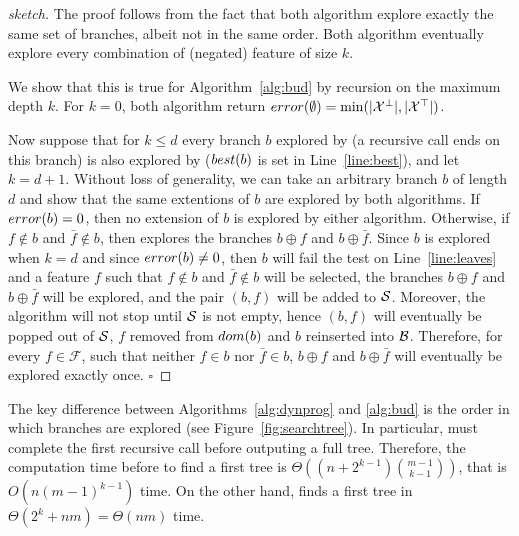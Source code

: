 \documentclass{llncs}
\newcommand{\setex}[1]{\ensuremath{{\mathcal X}^{#1}}\xspace}
\newcommand{\posex}{{\setex{\top}}\xspace}
\newcommand{\negex}{{\setex{\bot}}\xspace}
\newcommand{\features}{\ensuremath{{\mathcal F}}\xspace}
\newcommand{\bud}[0]{\ensuremath{{\cal B}}}
\newcommand{\sequence}[0]{\ensuremath{{\cal S}}}
\newcommand{\afeat}[0]{\ensuremath{f}}
\newcommand{\dom}[1][]{\ensuremath{\ifthenelse{\equal{#1}{}}{dom}{dom({#1})}}}
\newcommand{\best}[1][]{\ensuremath{\ifthenelse{\equal{#1}{}}{{best}}{{best({#1})}}}}
\newcommand{\error}[1][]{\ensuremath{\ifthenelse{\equal{#1}{}}{{error}}{{error({{#1}})}}}}
\newcommand{\abranch}[0]{\ensuremath{b}}
\newcommand{\numex}[0]{\ensuremath{n}}
\newcommand{\numfeat}[0]{\ensuremath{m}}
\newcommand{\mdepth}[0]{\ensuremath{k}}
\newcommand{\grow}[2]{\ensuremath{{#1}\oplus{#2}}}
\begin{document}
			\begin{proof}[sketch]
				The proof follows from the fact that both algorithm explore exactly the same set of branches, albeit not in the same order.
				Both algorithm eventually explore every combination of (negated) feature of size $\mdepth$.
				
				We show that this is true for Algorithm~\ref{alg:bud} by recursion on the maximum depth $\mdepth$.
				For $\mdepth = 0$, both algorithm return $\error[\emptyset]=\min(|\negex|, |\posex|)$.
				
				Now suppose that for $\mdepth \leq d$ every branch $\abranch$ explored by \dynprog (a recursive call ends on this branch) is also explored by \budalg ($\best[\abranch]$ is set in Line~\ref{line:best}), and let $\mdepth=d+1$. Without loss of generality, we can take an arbitrary branch $\abranch$ of length $d$ and show that the same extentions of $\abranch$ are explored by both algorithms.
				If $\error[\abranch]=0$, then no extension of $\abranch$ is explored by either algorithm.
				Otherwise, if $\afeat \not\in \abranch$ and $\bar{\afeat}\not\in \abranch$, then 
				\dynprog explores the branches $\grow{\abranch}{\afeat}$ and $\grow{\abranch}{\bar{\afeat}}$.
				Since $\abranch$ is explored when $\mdepth = d$ and since $\error[\abranch] \neq 0$, then $\abranch$ will fail the test on Line~\ref{line:leaves} and a feature $\afeat$ such that $\afeat \not\in \abranch$ and $\bar{\afeat}\not\in \abranch$ will be selected, 
				the branches $\grow{\abranch}{\afeat}$ and $\grow{\abranch}{\bar{\afeat}}$ will be explored, and the pair $(\abranch, \afeat)$ will be added to $\sequence$. 
				Moreover, the algorithm will not stop until $\sequence$ is not empty, hence $(\abranch, \afeat)$ will eventually be popped out of $\sequence$, $\afeat$ removed from $\dom[\abranch]$ and $\abranch$ reinserted into $\bud$. Therefore, for every $\afeat \in \features$, such that neither $\afeat \in \abranch$ nor $\bar{\afeat}\in \abranch$,
				 $\grow{\abranch}{\afeat}$ and $\grow{\abranch}{\bar{\afeat}}$ will eventually be explored exactly once.
				\hfill$\square$
			\end{proof}
			
			\medskip
			
			The key difference between Algorithms~\ref{alg:dynprog} and \ref{alg:bud} is the order in which branches are explored (see Figure~\ref{fig:searchtree}). In particular, \dynprog must complete the first recursive call before outputing a full tree. Therefore, the computation time before to find a first tree is $\Theta((\numex+2^{\mdepth-1}){\numfeat-1 \choose \mdepth-1})$, that is $O(\numex(\numfeat-1)^{\mdepth-1})$ time. On the other hand, \budalg finds a first tree in $\Theta(2^{\mdepth}+\numex\numfeat) = \Theta(\numex\numfeat)$ time.
			
\end{document}

